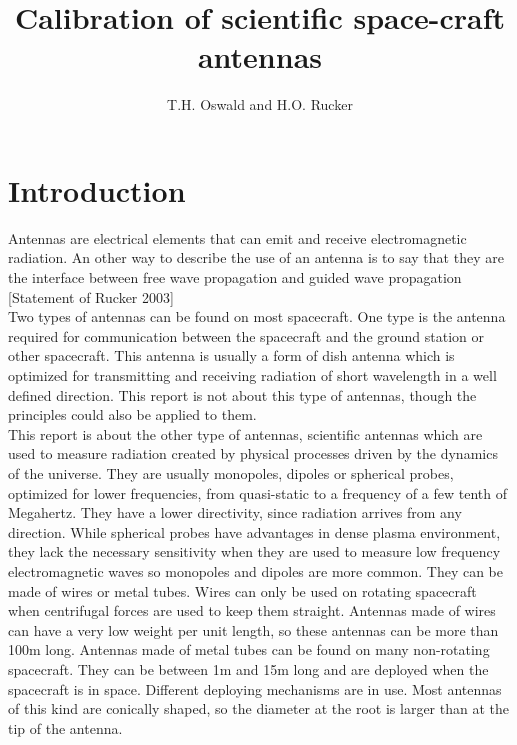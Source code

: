 \documentclass[a4paper,11pt]{report}
\title{Calibration of scientific space-craft antennas}
\author{T.H. Oswald and H.O. Rucker}
\begin{document}
\maketitle

\begin{abstract}

\end{abstract}
\chapter{Introduction}
Antennas are electrical elements that can emit and receive electromagnetic radiation. An other way to describe the use of an antenna is to say that they are the interface between free wave propagation and guided wave propagation [Statement of Rucker 2003]\\

Two types of antennas can be found on most spacecraft. One type is the antenna required for communication between the spacecraft and the ground station or other spacecraft. This antenna is usually a form of dish antenna which is optimized for transmitting and receiving radiation of short wavelength in a well defined direction. This report is not about this type of antennas, though the principles could also be applied to them.\\ 

This report is about the other type of antennas, scientific antennas which are used to measure radiation created by physical processes driven by the dynamics of the universe. They are usually monopoles, dipoles or spherical probes, optimized for lower frequencies, from quasi-static to a frequency of a few tenth of Megahertz. They have a lower directivity, since radiation arrives from any direction. While spherical probes have advantages in dense plasma environment, they lack the necessary sensitivity when they are used to measure low frequency electromagnetic waves so monopoles and dipoles are more common. They can be made of wires or metal tubes. Wires can only be used on rotating spacecraft when centrifugal forces are used to keep them straight. Antennas made of wires can have a very low weight per unit length, so these antennas can be more than 100m long. Antennas made of metal tubes can be found on many non-rotating spacecraft. They can be between 1m and 15m long and are deployed when the spacecraft is in space. Different deploying mechanisms are in use. Most antennas of this kind are conically shaped, so the diameter at the root is larger than at the tip of the antenna.\\
\end{document}
